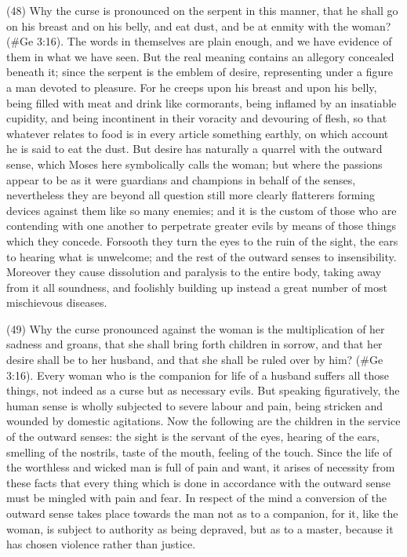 (48) Why the curse is pronounced on the serpent in this manner, that he shall go on his breast and
on his belly, and eat dust, and be at enmity with the woman? (\#Ge 3:16). The words in
themselves are plain enough, and we have evidence of them in what we have seen. But the real
meaning contains an allegory concealed beneath it; since the serpent is the emblem of desire,
representing under a figure a man devoted to pleasure. For he creeps upon his breast and upon
his belly, being filled with meat and drink like cormorants, being inflamed by an insatiable cupidity,
and being incontinent in their voracity and devouring of flesh, so that whatever relates to food is in
every article something earthly, on which account he is said to eat the dust. But desire has
naturally a quarrel with the outward sense, which Moses here symbolically calls the woman; but
where the passions appear to be as it were guardians and champions in behalf of the senses,
nevertheless they are beyond all question still more clearly flatterers forming devices against them
like so many enemies; and it is the custom of those who are contending with one another to
perpetrate greater evils by means of those things which they concede. Forsooth they turn the eyes
to the ruin of the sight, the ears to hearing what is unwelcome; and the rest of the outward senses
to insensibility. Moreover they cause dissolution and paralysis to the entire body, taking away from
it all soundness, and foolishly building up instead a great number of most mischievous diseases.

(49) Why the curse pronounced against the woman is the multiplication of her sadness and
groans, that she shall bring forth children in sorrow, and that her desire shall be to her husband,
and that she shall be ruled over by him? (\#Ge 3:16). Every woman who is the companion for
life of a husband suffers all those things, not indeed as a curse but as necessary evils. But
speaking figuratively, the human sense is wholly subjected to severe labour and pain, being
stricken and wounded by domestic agitations. Now the following are the children in the service of
the outward senses: the sight is the servant of the eyes, hearing of the ears, smelling of the
nostrils, taste of the mouth, feeling of the touch. Since the life of the worthless and wicked man is
full of pain and want, it arises of necessity from these facts that every thing which is done in
accordance with the outward sense must be mingled with pain and fear. In respect of the mind a
conversion of the outward sense takes place towards the man not as to a companion, for it, like
the woman, is subject to authority as being depraved, but as to a master, because it has chosen
violence rather than justice.

